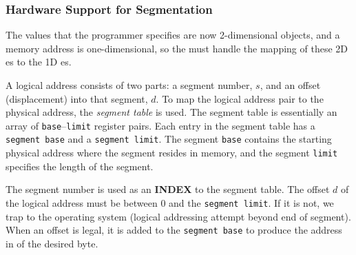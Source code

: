 \subsubsection{Hardware Support for Segmentation}\label{subsubsec:Segmentation_Hardware_Support}
The values that the programmer specifies are now 2-dimensional objects, and a memory address is one-dimensional, so the  must handle the mapping of these 2D es to the 1D es.

A logical address consists of two parts: a segment number, $s$, and an offset (displacement) into that segment, $d$.
To map the logical address pair to the physical address, the \emph{segment table} is used.
The segment table is essentially an array of \texttt{base}–\texttt{limit} register pairs.
Each entry in the segment table has a \texttt{segment base} and a \texttt{segment limit}.
The segment \texttt{base} contains the starting physical address where the segment resides in memory, and the segment \texttt{limit} specifies the length of the segment.

The segment number is used as an \textbf{INDEX} to the segment table.
The offset $d$ of the logical address must be between 0 and the \texttt{segment limit}.
If it is not, we trap to the operating system (logical addressing attempt beyond end of segment).
When an offset is legal, it is added to the \texttt{segment base} to produce the address in  of the desired byte.

